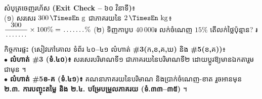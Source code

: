 \documentclass[a4paper,10pt]{article}
\newcommand{\en}[1]{{\TimesEn #1}}
\newcommand{\enbf}[1]{{\TimesEn\bfseries #1}}
\newcommand{\unit}[1]{\,\text{\en{#1}}}
\newcommand{\blank}[1][1.5cm]{\makebox[#1]{\dotfill}}
\begin{document}
\vspace{5pt}
\begin{tcolorbox}[enhanced, sharp corners, colback=white, colframe=black, boxrule=0.85pt, boxsep=2.5pt, top=3.5pt, bottom=3.5pt, left=5pt, right=5pt]
  {\muol\fontsize{8.8pt}{12.5pt}\selectfont សំបុត្រចេញរហ័ស \enbf{(Exit Check --} ៦០ វិនាទី\enbf{)}៖}\\[2pt]
  (១) សរសេរ $300\unit{g}$ ជាភាគរយនៃ $2\unit{kg}$៖ $\dfrac{300}{\blank[1.1cm]}\times 100\% = \blank[1.1cm]\%$ \quad\en{|}\quad
  (២) ទិញកាបូប $40\,000\text{៛}$ លក់ចំណេញ $15\%$ តើលក់ថ្លៃប៉ុន្មាន? \blank[2.0cm]៛
\end{tcolorbox}

\vspace{3pt}
\begin{tcolorbox}[enhanced, sharp corners, colback=panelgray, colframe=black, boxrule=0.75pt, boxsep=2pt, top=3pt, bottom=3pt, left=5pt, right=5pt]
  {\muol\fontsize{8.8pt}{12.5pt}\selectfont កិច្ចការផ្ទះ \enbf{(}សៀវភៅគោល ទំព័រ ៤០\enbf{--}៤១ លំហាត់ \enbf{\#3(}ក\enbf{,}ខ\enbf{,}គ\enbf{,}ឃ\enbf{)} និង \enbf{\#5(}ខ\enbf{,}គ\enbf{))}៖}\\[2pt]
  $\bullet$ \textbf{លំហាត់ \#3 (ទំ.៤០)៖} សរសេរបរិមាណទី១ ជាភាគរយនៃបរិមាណទី២ ដោយប្ដូរឱ្យមានឯកតារួមជាមុន ។\\
  $\bullet$ \textbf{លំហាត់ \#5ខ-គ (ទំ.៤១)៖} គណនាភាគរយនៃបរិមាណ និងប្រាក់ចំណេញ-ខាត រួចអានមុន \textbf{២.៣. ការបញ្ចុះតម្លៃ និង ២.៤. បម្រែបម្រួលភាគរយ (ទំ.៣៣–៣៥)} ។
\end{tcolorbox}
\end{document}
